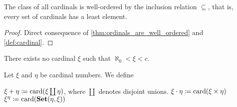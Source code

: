 \begin{proposition}\label{thm:cardinals_well_ordered}
  The class of all cardinals is well-ordered by the inclusion relation $\subseteq$, that is, every set of cardinals has a least element.
\end{proposition}
\begin{proof}
  Direct consequence of \cref{thm:ordinals_are_well_ordered} and \cref{def:cardinal}.
\end{proof}

\begin{hypothesis}\label{hyp:continuum_hypothesis}
  There exists no cardinal $\xi$ such that $\aleph_0 < \xi < c$.
\end{hypothesis}

\begin{definition}\label{def:cardinal_arithmetic}
  Let $\xi$ and $\eta$ be cardinal numbers. We define
  \begin{description}
     $\xi + \eta \coloneqq \operatorname{card}(\xi \coprod \eta)$, where $\coprod$ denotes disjoint unions.
     $\xi \cdot \eta \coloneqq \operatorname{card}(\xi \times \eta)$
     $\xi^\eta \coloneqq \operatorname{card}(\operatorname{\mathbf{Set}}(\eta, \xi))$
  \end{description}
\end{definition}
